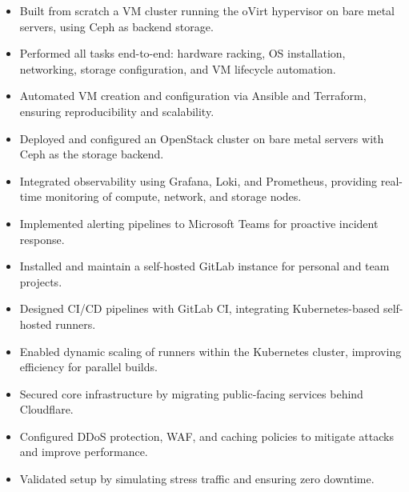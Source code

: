 \documentclass[10pt,a4paper,ragged2e,withhyper]{altacv}
\begin{document}

\begin{itemize}
  \item Built from scratch a VM cluster running the oVirt hypervisor on bare metal servers, using Ceph as backend storage.
  \item Performed all tasks end-to-end: hardware racking, OS installation, networking, storage configuration, and VM lifecycle automation.
  \item Automated VM creation and configuration via Ansible and Terraform, ensuring reproducibility and scalability.
\end{itemize}
\divider

\begin{itemize}
  \item Deployed and configured an OpenStack cluster on bare metal servers with Ceph as the storage backend.
  \item Integrated observability using Grafana, Loki, and Prometheus, providing real-time monitoring of compute, network, and storage nodes.
  \item Implemented alerting pipelines to Microsoft Teams for proactive incident response.
\end{itemize}
\divider

\begin{itemize}
  \item Installed and maintain a self-hosted GitLab instance for personal and team projects.
  \item Designed CI/CD pipelines with GitLab CI, integrating Kubernetes-based self-hosted runners.
  \item Enabled dynamic scaling of runners within the Kubernetes cluster, improving efficiency for parallel builds.
\end{itemize}
\divider

\begin{itemize}
  \item Secured core infrastructure by migrating public-facing services behind Cloudflare.
  \item Configured DDoS protection, WAF, and caching policies to mitigate attacks and improve performance.
  \item Validated setup by simulating stress traffic and ensuring zero downtime.
\end{itemize}
\divider
\end{document}
